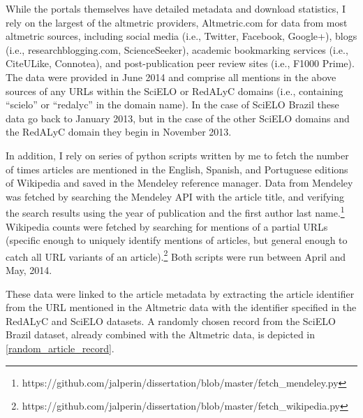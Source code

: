 While the portals themselves have detailed metadata and download statistics, I rely on the largest of the altmetric providers, Altmetric.com for data from most altmetric sources, including social media (i.e., Twitter, Facebook, Google+), blogs (i.e., researchblogging.com, ScienceSeeker), academic bookmarking services (i.e., CiteULike, Connotea), and post-publication peer review sites (i.e., F1000 Prime). The data were provided in June 2014 and comprise all mentions in the above sources of any URLs within the SciELO or RedALyC domains (i.e., containing ``scielo'' or ``redalyc'' in the domain name). In the case of SciELO Brazil these data go back to January 2013, but in the case of the other SciELO domains and the RedALyC domain they begin in November 2013.

In addition, I rely on series of python scripts written by me to fetch the number of times articles are mentioned in the English, Spanish, and Portuguese editions of Wikipedia and saved in the Mendeley reference manager. Data from Mendeley was fetched by searching the Mendeley API with the article title, and verifying the search results using the year of publication and the first author last name.\footnote{https:\slash \slash github.com\slash jalperin\slash dissertation\slash blob\slash master\slash fetch\_mendeley.py} Wikipedia counts were fetched by searching for mentions of a partial URLs (specific enough to uniquely identify mentions of articles, but general enough to catch all URL variants of an article).\footnote{https:\slash \slash github.com\slash jalperin\slash dissertation\slash blob\slash master\slash fetch\_wikipedia.py} Both scripts were run between April and May, 2014.

These data were linked to the article metadata by extracting the article identifier from the URL mentioned in the Altmetric data with the identifier specified in the RedALyC and SciELO datasets. A randomly chosen record from the SciELO Brazil dataset, already combined with the Altmetric data, is depicted in \autoref{random_article_record}.



